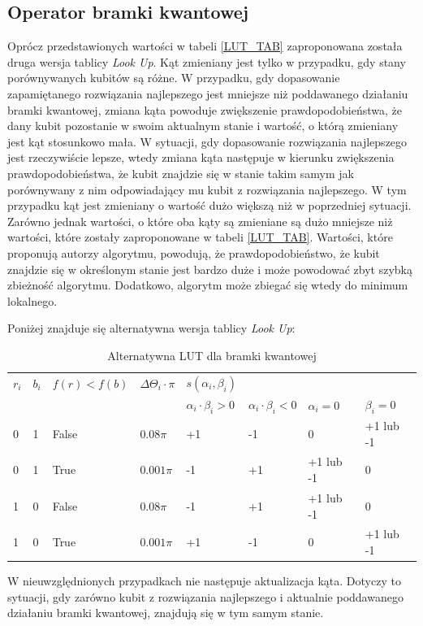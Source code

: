 \subsection{Operator bramki kwantowej}
Oprócz przedstawionych wartości w tabeli \ref{LUT_TAB} zaproponowana została druga wersja tablicy \textit{Look Up}. Kąt zmieniany jest tylko w przypadku, gdy stany porównywanych kubitów są różne. W przypadku, gdy dopasowanie zapamiętanego rozwiązania najlepszego jest mniejsze niż poddawanego działaniu bramki kwantowej, zmiana kąta powoduje zwiększenie prawdopodobieństwa, że dany kubit pozostanie w swoim aktualnym stanie i wartość, o którą zmieniany jest kąt stosunkowo mała. W sytuacji, gdy dopasowanie rozwiązania najlepszego jest rzeczywiście lepsze, wtedy zmiana kąta następuje w kierunku zwiększenia prawdopodobieństwa, że kubit znajdzie się w stanie takim samym jak porównywany z nim odpowiadający mu kubit z rozwiązania najlepszego. W tym przypadku kąt jest zmieniany o wartość dużo większą niż w poprzedniej sytuacji. Zarówno jednak wartości, o które oba kąty są zmieniane są dużo mniejsze niż wartości, które zostały zaproponowane w tabeli \ref{LUT_TAB}. Wartości, które proponują autorzy algorytmu, powodują, że prawdopodobieństwo, że kubit znajdzie się w określonym stanie jest bardzo duże i może powodować zbyt szybką zbieżność algorytmu. Dodatkowo, algorytm może zbiegać się wtedy do minimum lokalnego.

Poniżej znajduje się alternatywna wersja tablicy \textit{Look Up}:
\begin{table}[h]
\label{LUT_TAB_MOD}
\begin{tabular}{l l l l l l l l}
\hline
$r_i$ & $b_i$ & $f(r)<f(b)$ & $\Delta\Theta_i \cdot \pi$ & $s(\alpha_i,\beta_i)$ & & & \\
\cline{5-8} 
& & & & $\alpha_i \cdot \beta_i > 0$ & $\alpha_i \cdot \beta_i < 0$ & $\alpha_i = 0$ & $\beta_i = 0$ \\
\hline
0 & 1 & False & $0.08\pi$  & +1 & -1 & 0         & +1 lub -1\\
0 & 1 & True  & $0.001\pi$ & -1 & +1 & +1 lub -1 & 0\\
1 & 0 & False & $0.08\pi$  & -1 & +1 & +1 lub -1 & 0\\
1 & 0 & True  & $0.001\pi$ & +1 & -1 & 0         & +1 lub -1\\
\hline
\end{tabular}
\caption{Alternatywna LUT dla bramki kwantowej}
\end{table} 

W nieuwzględnionych przypadkach nie następuje aktualizacja kąta. Dotyczy to sytuacji, gdy zarówno kubit z rozwiązania najlepszego i aktualnie poddawanego działaniu bramki kwantowej, znajdują się w tym samym stanie.
